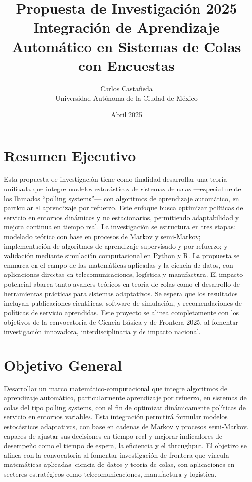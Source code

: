 \documentclass[12pt]{article}
\title{Propuesta de Investigación 2025\\Integración de Aprendizaje Automático en Sistemas de Colas con Encuestas}
\author{Carlos Castañeda\\Universidad Autónoma de la Ciudad de México}
\date{Abril 2025}
\begin{document}
\maketitle

\section*{Resumen Ejecutivo}
Esta propuesta de investigación tiene como finalidad desarrollar una teoría unificada que integre modelos estocásticos de sistemas de colas —especialmente los llamados “polling systems”— con algoritmos de aprendizaje automático, en particular el aprendizaje por refuerzo. Este enfoque busca optimizar políticas de servicio en entornos dinámicos y no estacionarios, permitiendo adaptabilidad y mejora continua en tiempo real. La investigación se estructura en tres etapas: modelado teórico con base en procesos de Markov y semi-Markov; implementación de algoritmos de aprendizaje supervisado y por refuerzo; y validación mediante simulación computacional en Python y R. La propuesta se enmarca en el campo de las matemáticas aplicadas y la ciencia de datos, con aplicaciones directas en telecomunicaciones, logística y manufactura. El impacto potencial abarca tanto avances teóricos en teoría de colas como el desarrollo de herramientas prácticas para sistemas adaptativos. Se espera que los resultados incluyan publicaciones científicas, software de simulación, y recomendaciones de políticas de servicio aprendidas. Este proyecto se alinea completamente con los objetivos de la convocatoria de Ciencia Básica y de Frontera 2025, al fomentar investigación innovadora, interdisciplinaria y de impacto nacional.

\section*{Objetivo General}
Desarrollar un marco matemático-computacional que integre algoritmos de aprendizaje automático, particularmente aprendizaje por refuerzo, en sistemas de colas del tipo polling systems, con el fin de optimizar dinámicamente políticas de servicio en entornos variables. Esta integración permitirá formular modelos estocásticos adaptativos, con base en cadenas de Markov y procesos semi-Markov, capaces de ajustar sus decisiones en tiempo real y mejorar indicadores de desempeño como el tiempo de espera, la eficiencia y el throughput. El objetivo se alinea con la convocatoria al fomentar investigación de frontera que vincula matemáticas aplicadas, ciencia de datos y teoría de colas, con aplicaciones en sectores estratégicos como telecomunicaciones, manufactura y logística.
\end{document}
